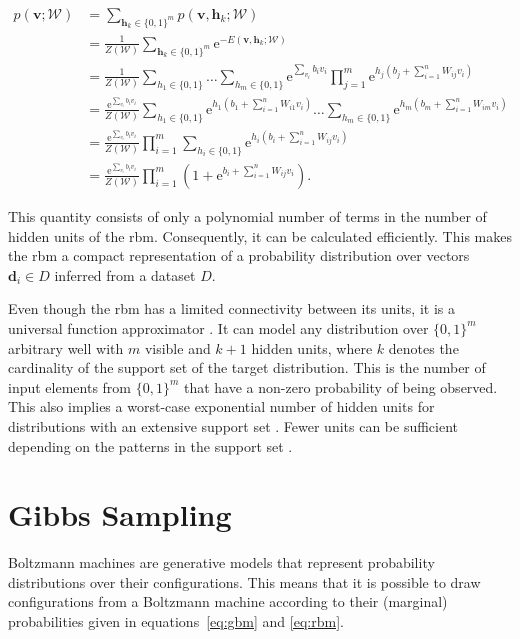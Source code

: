\begin{align}
   p(\bm{v};\mathcal{W}) &= \sum_{\bm{h}_k \in \{0,1\}^m} p(\bm{v},\bm{h}_k;\mathcal{W})\\
   &= \frac{1}{Z(\mathcal{W})}\sum_{\bm{h}_k \in \{0,1\}^m} \mathrm{e}^{-E(\bm{v}, \bm{h}_k;\mathcal{W})}\\
   &= \frac{1}{Z(\mathcal{W})}\sum_{h_1\in \{0,1\}}\dots\sum_{h_m \in \{0,1\}}\mathrm{e}^{\sum_{v_i}b_iv_i}\prod_{j=1}^m\mathrm{e}^{h_j(b_j + \sum_{i=1}^nW_{ij}v_i)}\\
   &= \frac{\mathrm{e}^{\sum_{v_i}b_iv_i}}{Z(\mathcal{W})}\sum_{h_1 \in \{0,1\}}\mathrm{e}^{h_1(b_1 + \sum_{i=1}^nW_{i1}v_i)}\dots\sum_{h_m \in \{0,1\}}\mathrm{e}^{h_m(b_m + \sum_{i=1}^nW_{im}v_i)}\\
   &= \frac{\mathrm{e}^{\sum_{v_i}b_iv_i}}{Z(\mathcal{W})}\prod_{i=1}^m\sum_{h_i \in \{0,1\}}\mathrm{e}^{h_i(b_i + \sum_{i=1}^nW_{ij}v_i)}\\
   \label{eq:rbm}
   &= \frac{\mathrm{e}^{\sum_{v_i}b_iv_i}}{Z(\mathcal{W})}\prod_{i=1}^m(1+\mathrm{e}^{b_i + \sum_{i=1}^nW_{ij}v_i}).
\end{align}

This quantity consists of only a polynomial number of terms in the number of hidden units of the \gls{rbm}. Consequently, it can be calculated efficiently. This makes the \gls{rbm} a compact representation of a probability distribution over vectors $\bm{d}_i \in D$ inferred from a dataset $D$.

Even though the \gls{rbm} has a limited connectivity between its units, it is a universal function approximator \cite{le2008representational}.
It can model any distribution over $\{0,1\}^m$ arbitrary well with $m$ visible and $k+1$ hidden units, where 
$k$ denotes the cardinality of the support set of the target distribution. This is the number of input elements
from $\{0,1\}^m$ that have a non-zero probability of being observed. This also implies a worst-case 
exponential number of hidden units for distributions with an extensive support set \cite{le2008representational}. Fewer units can be sufficient depending on the patterns in the support set \cite{montufar2011refinements}.

\section{Gibbs Sampling}
\label{sec:gibbsSampling}

Boltzmann machines are generative models that represent probability distributions over their configurations. This means that it is possible to draw configurations from a Boltzmann machine
according to their (marginal) probabilities given in equations~\ref{eq:gbm} and \ref{eq:rbm}.

